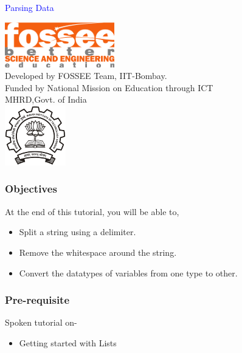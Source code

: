 \documentclass[presentation]{beamer}
\title{}
\author{FOSSEE}
\date{}
\begin{document}
\begin{frame}

\begin{center}
\vspace{12pt}
\textcolor{blue}{\huge Parsing Data}
\end{center}
\vspace{18pt}
\begin{center}
\vspace{10pt}
\includegraphics[scale=0.95]{../images/fossee-logo.png}\\
\vspace{5pt}
\scriptsize Developed by FOSSEE Team, IIT-Bombay. \\ 
\scriptsize Funded by National Mission on Education through ICT\\
\scriptsize  MHRD,Govt. of India\\
\includegraphics[scale=0.30]{../images/iitb-logo.png}\\
\end{center}
\end{frame}
\begin{frame}
\frametitle{Objectives}
\label{sec-2}

  At the end of this tutorial, you will be able to,


\begin{itemize}
\item Split a string using a delimiter.
\item Remove the whitespace around the string.
\item Convert the datatypes of variables from one type to other.
\end{itemize}
\end{frame}
\begin{frame}
\frametitle{Pre-requisite}
\label{sec-3}

  Spoken tutorial on-

\begin{itemize}
\item Getting started with Lists
\end{itemize}
\end{frame}
\end{document}
